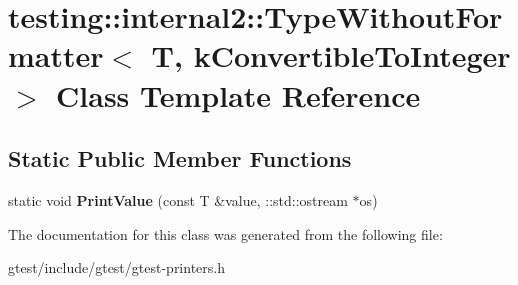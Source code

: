 \hypertarget{classtesting_1_1internal2_1_1TypeWithoutFormatter_3_01T_00_01kConvertibleToInteger_01_4}{}\section{testing\+:\+:internal2\+:\+:Type\+Without\+Formatter$<$ T, k\+Convertible\+To\+Integer $>$ Class Template Reference}
\label{classtesting_1_1internal2_1_1TypeWithoutFormatter_3_01T_00_01kConvertibleToInteger_01_4}
\subsection*{Static Public Member Functions}
\begin{DoxyCompactItemize}
\item 
\mbox{\label{classtesting_1_1internal2_1_1TypeWithoutFormatter_3_01T_00_01kConvertibleToInteger_01_4_ab27a411afb608e730a57d232b3f4f486}} 
static void {\bfseries Print\+Value} (const T \&value, \+::std\+::ostream $\ast$os)
\end{DoxyCompactItemize}


The documentation for this class was generated from the following file\+:\begin{DoxyCompactItemize}
\item 
gtest/include/gtest/gtest-\/printers.\+h\end{DoxyCompactItemize}
